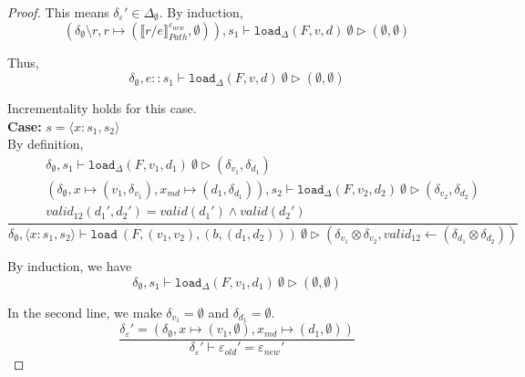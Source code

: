 \documentclass[10pt,twoside,a4paper]{article}
\theoremstyle{theorem}
\theoremstyle{lemma}
\theoremstyle{property}
\theoremstyle{definition}
\theoremstyle{assumption}
\begin{document}
\begin{proof}
		This means $\delta_\varepsilon' \in \Delta_{\emptyset}$. By induction,
		\begin{displaymath}
		(\delta_{\emptyset} \setminus r, r \mapsto (\llbracket r/e \rrbracket^{\varepsilon_{new}}_{Path}, \emptyset)) , s_1 \vdash \mathtt{load}_\Delta (F,v,d)~ \emptyset \rhd (\emptyset,\emptyset)
		\end{displaymath}

		Thus, 
		\begin{displaymath}
		\delta_{\emptyset}, e::s_1 \vdash \mathtt{load}_\Delta (F,v,d)~ \emptyset \rhd (\emptyset,\emptyset)
		\end{displaymath}
		
		Incrementality holds for this case.\\

	\textbf{Case: } $s = \langle x : s_1, s_2 \rangle$\\

	By definition,
	\begin{displaymath}
	\frac{\begin{array}{c}
		\delta_{\emptyset}, s_1 \vdash \mathtt{load}_\Delta (F,v_1,d_1)~ \emptyset \rhd (\delta_{v_1},\delta_{d_1})\\
		(\delta_{\emptyset}, x \mapsto (v_1, \delta_{v_1}), x_{md} \mapsto (d_1, \delta_{d_1})), s_2 \vdash \mathtt{load}_\Delta (F,v_2,d_2)~ \emptyset \rhd (\delta_{v_2},\delta_{d_2})\\
		valid_{12}({d_1}',{d_2}') = valid({d_1}') \wedge valid({d_2}')
	\end{array}}
	{\delta_{\emptyset}, \langle x:s_1,s_2 \rangle \vdash \mathtt{load}~ (F,(v_1,v_2),(b,(d_1,d_2)))~ \emptyset \rhd (\delta_{v_1} \otimes \delta_{v_2},valid_{12} \leftarrow (\delta_{d_1} \otimes \delta_{d_2})) }
	\end{displaymath}

	By induction, we have
	\begin{displaymath}
		\delta_{\emptyset}, s_1 \vdash \mathtt{load}_\Delta (F,v_1,d_1)~ \emptyset \rhd (\emptyset,\emptyset)
	\end{displaymath}

	In the second line, we make $\delta_{v_1} = \emptyset $ and $ \delta_{d_1} = \emptyset$.
	\begin{displaymath}
	\frac{
		\delta_\varepsilon' = (\delta_{\emptyset}, x \mapsto (v_1, \emptyset), x_{md} \mapsto (d_1, \emptyset))
	}
	{	\delta_\varepsilon' \vdash \varepsilon_{old}' = \varepsilon_{new}' }
	\end{displaymath}


\end{proof}
\end{document}
